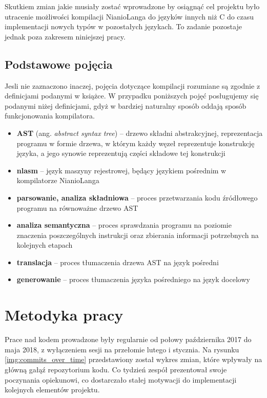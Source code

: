 \documentclass[licencjacka]{pracamgr}
\begin{document}
Skutkiem zmian jakie musiały zostać wprowadzone by osiągnąć cel projektu było utracenie możliwości
kompilacji NianioLanga do języków innych niż C do czasu implementacji nowych typów w pozostałych językach.
To zadanie pozostaje jednak poza zakresem niniejszej pracy.

\section{Podstawowe pojęcia}
Jesli nie zaznaczono inaczej, pojęcia dotyczące kompilacji rozumiane są zgodnie z definicjami
podanymi w książce\cite{dragonbook}. W przypadku poniższych pojęć posługujemy się podanymi niżej definicjami, gdyż w bardziej naturalny sposób oddają sposób funkcjonowania kompilatora.
\begin{itemize}
  \item[] \textbf{AST} (ang. \textit{abstract syntax tree}) -- drzewo składni abstrakcyjnej,
    reprezentacja programu w formie drzewa, w którym każdy węzeł
    reprezentuje konstrukcję języka, a jego synowie reprezentują części składowe tej konstrukcji
  \item[] \textbf{nlasm} -- język maszyny rejestrowej, będący językiem pośrednim w kompilatorze NianioLanga
  \item[] \textbf{parsowanie, analiza składniowa} -- proces przetwarzania kodu źródłowego programu na równoważne drzewo
  AST
  \item[] \textbf{analiza semantyczna} -- proces sprawdzania programu na poziomie znaczenia poszczególnych instrukcji
  oraz zbierania informacji potrzebnych na kolejnych etapach
  \item[] \textbf{translacja} -- proces tłumaczenia drzewa AST na język pośredni
  \item[] \textbf{generowanie} -- proces tłumaczenia języka pośredniego na język docelowy
\end{itemize}

\chapter{Metodyka pracy}
Prace nad kodem prowadzone były regularnie od połowy października 2017 do maja 2018,
z wyłączeniem sesji na przełomie lutego i stycznia. Na rysunku \ref{img:commits_over_time}
przedstawiony został wykres zmian, które wpływały na główną gałąź repozytorium kodu.
Co tydzień zespół prezentował swoje poczynania opiekunowi, co dostarczało stałej motywacji
do implementacji kolejnych elementów projektu.
\end{document}
